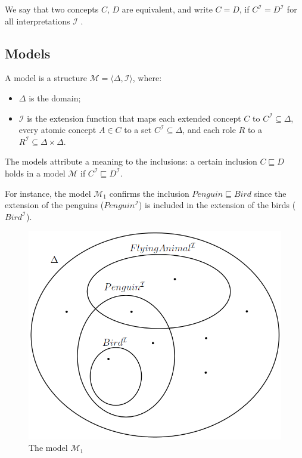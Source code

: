 \documentclass[a4paper, 11pt, oneside]{duthesis}
\newcommand{\II} {\mathcal{I}}
\begin{document}
We say that two concepts $C$, $D$ are equivalent, and write $C = D$, if $C^{\II} = D^{\II}$ for all interpretations $\II$
\cite{Baader:2003:BDL:885746.885749}.

\subsection{Models}
A model is a structure $\mathcal{M} = \langle \Delta, \mathcal{I}\rangle$, where:
\begin{itemize}
\item $\Delta$ is the domain;
\item $\mathcal{I}$ is the extension function that maps each extended concept $C$ to $C^\mathcal{I} \subseteq \Delta$, every atomic concept $A \in C$ to a set $C^\mathcal{I} \subseteq \Delta$, and each role $R$ to a $R^\mathcal{I} \subseteq \Delta \times \Delta$.
\end{itemize}

The models attribute a meaning to the inclusions: a certain inclusion $C \sqsubseteq D$ holds in a model $\mathcal{M}$ if $C^\mathcal{I} \sqsubseteq D^\mathcal{I}$.

\newpage

For instance, the model $\mathcal{M}_{1}$ confirms the inclusion $Penguin \sqsubseteq Bird$ since the extension of the penguins ($Penguin^{\mathcal{I}}$) is included in the extension of the birds ($Bird^{\mathcal{I}}$).

\begin{figure}[H]
\centering
\includegraphics[scale=.34]{img/diagram1_2.png}
\caption{The model $\mathcal{M}_1$}
\label{}
\end{figure}
\end{document}
